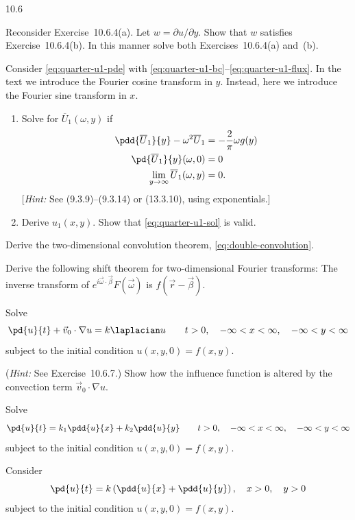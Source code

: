 \begin{exercises}{10.6}
\item Reconsider Exercise~10.6.4(a).  Let $w = \partial u/\partial y$.  Show that $w$ satisfies Exercise~10.6.4(b).  In this manner solve both Exercises~10.6.4(a) and~(b).

\item Consider \eqref{eq:quarter-u1-pde} with \eqref{eq:quarter-u1-bc}--\eqref{eq:quarter-u1-flux}.  In the text we introduce the Fourier cosine transform in $y$.  Instead, here we introduce the Fourier sine transform in $x$.
\begin{enumerate}
\item[(a)] Solve for $\overline{U}_1(\omega,y)$ if
\begin{align*}
\pdd{\overline{U}_1}{y} - \omega^2\overline{U}_1 &= -\frac{2}{\pi}\omega g(y) \\
\pd{\overline{U}_1}{y}(\omega,0) &= 0 \\
\lim_{y\to\infty}\overline{U}_1(\omega,y) &= 0.
\end{align*}
[\textit{Hint:} See (9.3.9)--(9.3.14) or (13.3.10), using exponentials.]
\item[(b)] Derive $u_1(x,y)$.  Show that \eqref{eq:quarter-u1-sol} is valid.
\end{enumerate}

\item Derive the two-dimensional convolution theorem, \eqref{eq:double-convolution}.

\item Derive the following shift theorem for two-dimensional Fourier transforms: The inverse transform of $e^{i\vec{\omega}\cdot\vec{\beta}}F(\vec{\omega})$ is $f(\vec{r}-\vec{\beta})$.

\item Solve
\[
\pd{u}{t} + \vec{v}_0\cdot\nabla u = k\laplacian u \qquad t > 0, \quad -\infty < x < \infty, \quad -\infty < y < \infty
\]
subject to the initial condition $u(x,y,0) = f(x,y)$.

(\textit{Hint:} See Exercise~10.6.7.)  Show how the influence function is altered by the convection term $\vec{v}_0\cdot\nabla u$.

\item Solve
\[
\pd{u}{t} = k_1\pdd{u}{x}+k_2\pdd{u}{y} \qquad t > 0, \quad -\infty < x < \infty, \quad -\infty < y < \infty
\]
subject to the initial condition $u(x,y,0) = f(x,y)$.

\item Consider
\[
\pd{u}{t} = k\left(\pdd{u}{x}+\pdd{u}{y}\right), \quad x > 0, \quad y > 0
\]
subject to the initial condition $u(x,y,0) = f(x,y)$.


\end{exercises}
